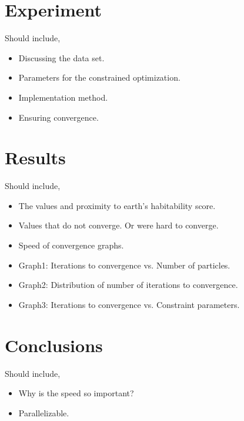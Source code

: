 \documentclass[10pt]{article}
\newenvironment{pointers}{%
  \noindent Should include,
  \begin{itemize}
    \setlength{\itemsep}{-1pt}}{%
\end{itemize}}
\begin{document}
\section{Experiment}
\begin{pointers}
\item Discussing the data set.
\item Parameters for the constrained optimization.
\item Implementation method.
\item Ensuring convergence.
\end{pointers}


\section{Results}
\begin{pointers}
\item The values and proximity to earth's habitability score.
\item Values that do not converge. Or were hard to converge.
\item Speed of convergence graphs.
\item Graph1: Iterations to convergence vs. Number of particles.
\item Graph2: Distribution of number of iterations to convergence.
\item Graph3: Iterations to convergence vs. Constraint parameters.
\end{pointers}


\section{Conclusions}
\begin{pointers}
\item Why is the speed so important?
\item Parallelizable.
\end{pointers}
\end{document}
